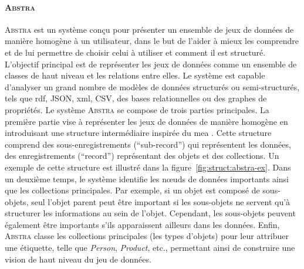 \paragraph{\textsc{Abstra}}
\textsc{Abstra} \cite{barretAbstraGenericAbstractions2022} est un système conçu pour présenter un ensemble de jeux de données de manière homogène à un utilisateur, dans le but de l'aider à mieux les comprendre et de lui permettre de choisir celui à utiliser et comment il est structuré.
L'objectif principal est de représenter les jeux de données comme un ensemble de classes de haut niveau et les relations entre elles.
Le système est capable d'analyser un grand nombre de modèles de données structurés ou semi-structurés, tels que \acrshort{rdf}, JSON, \acrshort{xml}, CSV, des bases relationnelles ou des graphes de propriétés.
Le système \textsc{Abstra} se compose de trois parties principales.
La première partie vise à représenter les jeux de données de manière homogène en introduisant une structure intermédiaire inspirée du \gls{mea} \cite{chenEntityrelationshipModelUnified1976}.
Cette structure comprend des sous-enregistrements (\enquote{sub-record}) qui représentent les données, des enregistrements (\enquote{record}) représentant des objets et des collections.
Un exemple de cette structure est illustré dans la figure~\ref{fig:struct:abstra-ex}.
Dans un deuxième temps, le système identifie les nœuds de données importants ainsi que les collections principales.
Par exemple, si un objet est composé de sous-objets, seul l'objet parent peut être important si les sous-objets ne servent qu'à structurer les informations au sein de l'objet.
Cependant, les sous-objets peuvent également être importants s'ils apparaissent ailleurs dans les données.
Enfin, \textsc{Abstra} classe les collections principales (les types d'objets) pour leur attribuer une étiquette, telle que \emph{Person}, \emph{Product}, etc., permettant ainsi de construire une vision de haut niveau du jeu de données.

